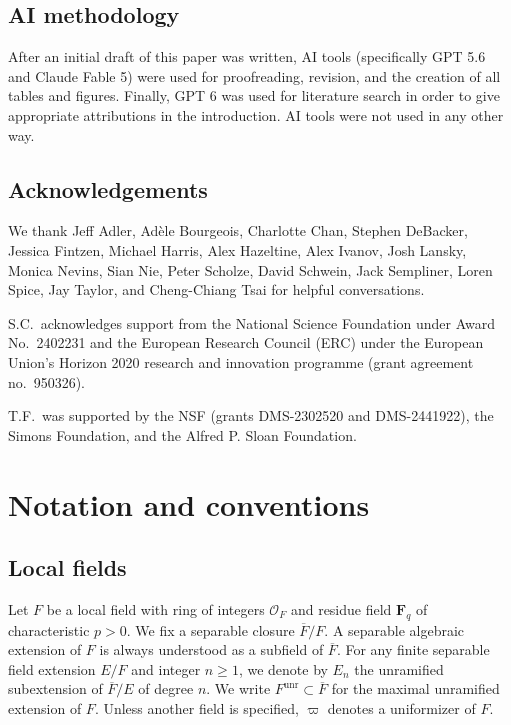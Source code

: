\documentclass[reqno]{amsart}
\numberwithin{equation}{subsection}
\newcommand{\F}{\mathbf{F}}
\newcommand{\ol}[1]{\overline{#1}}
\newcommand\cO{\mathcal{O}}
\DeclareMathOperator{\unr}{unr}
\theoremstyle{remark}
\numberwithin{equation}{subsection}
\numberwithin{figure}{subsection}
\begin{document}
\subsection{AI methodology} 

After an initial draft of this paper was written, AI tools (specifically GPT 5.6 and Claude Fable 5) were used for proofreading, revision, and the creation of all tables and figures. Finally, GPT 6 was used for literature search in order to give appropriate attributions in the introduction. AI tools were not used in any other way. 

\subsection{Acknowledgements}

We thank Jeff Adler, Ad\`ele Bourgeois, Charlotte Chan, Stephen DeBacker, Jessica Fintzen, Michael Harris, Alex Hazeltine, Alex Ivanov, Josh Lansky, Monica Nevins, Sian Nie, Peter Scholze, David Schwein, Jack Sempliner, Loren Spice, Jay Taylor, and Cheng-Chiang Tsai for helpful conversations. 

S.C.~acknowledges support from the National Science Foundation under Award No.\ 2402231 and the European Research Council (ERC) under the
European Union’s Horizon 2020 research and innovation programme (grant agreement no.\ 950326).

T.F.~was supported by the NSF (grants DMS-2302520 and DMS-2441922), the Simons Foundation, and the Alfred P. Sloan Foundation. 


\section{Notation and conventions}\label{ssec:notation}

\subsection{Local fields}
Let $F$ be a local field with ring of integers $\cO_F$ and residue field $\F_q$ of characteristic $p > 0$. We fix a separable closure $\ol F/F$. A separable algebraic extension of $F$ is always understood as a subfield of $\ol F$. For any finite separable field extension $E/F$ and integer $n \geq 1$, we denote by $E_n$ the unramified subextension of $\ol F/E$ of degree $n$. We write $F^{\unr}\subset \ol F$ for the maximal unramified extension of $F$. Unless another field is specified, $\varpi$ denotes a uniformizer of $F$.
\end{document}
